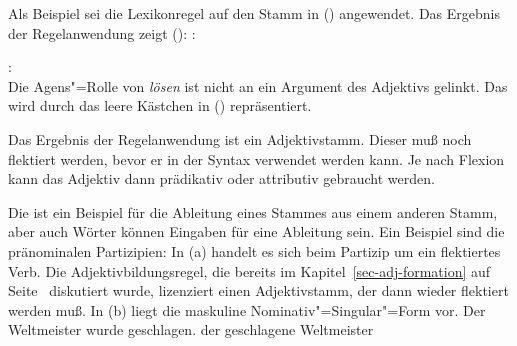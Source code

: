 \newpage
\noindent
Als Beispiel sei die Lexikonregel auf den Stamm  in ()
angewendet. Das Ergebnis der Regelanwendung zeigt ():
\eas
\mbox{:}\\
\zs{}

\noindent
\eas
{}:\\
\label{le-fahrbar}
\zs
Die Agens"=Rolle von \emph{lösen} ist nicht an ein Argument des
Adjektivs gelinkt. Das wird durch das leere Kästchen in ()
repräsentiert.

Das Ergebnis der Regelanwendung ist ein Adjektivstamm. Dieser muß noch flektiert werden, 
bevor er in der Syntax verwendet werden kann. Je nach Flexion kann das Adjektiv dann
prädikativ oder attributiv gebraucht werden.

Die \bard ist ein Beispiel für die Ableitung eines Stammes aus einem anderen Stamm, aber auch Wörter
können Eingaben für eine Ableitung sein. Ein Beispiel sind die pränominalen Partizipien: In (a) handelt es sich
beim Partizip um ein flektiertes Verb. Die Adjektivbildungsregel, die bereits im Kapitel~\ref{sec-adj-formation}
auf Seite~\pageref{lr-adjective-formation-da-approach} diskutiert wurde, lizenziert einen Adjektivstamm, der dann wieder
flektiert werden muß. In (b) liegt die maskuline Nominativ"=Singular"=Form vor.
\eal
\ex Der Weltmeister wurde geschlagen.
\ex der geschlagene Weltmeister
\zl
{}


